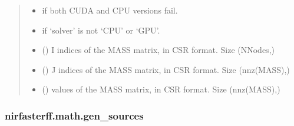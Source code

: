 \documentclass[letterpaper,10pt,english]{sphinxmanual}
\begin{document}
\begin{fulllineitems}
\begin{quote}
\begin{description}
\begin{itemize}
\end{itemize}

\begin{itemize}
\item {} 
\sphinxAtStartPar
{} \textendash{} if both CUDA and CPU versions fail.

\item {} 
\sphinxAtStartPar
{} \textendash{} if ‘solver’ is not ‘CPU’ or ‘GPU’.

\end{itemize}

\sphinxAtStartPar
\begin{itemize}
\item {} 
\sphinxAtStartPar
{} () \textendash{} I indices of the MASS matrix, in CSR format. Size (NNodes,)

\item {} 
\sphinxAtStartPar
{} () \textendash{} J indices of the MASS matrix, in CSR format. Size (nnz(MASS),)

\item {} 
\sphinxAtStartPar
{} () \textendash{} values of the MASS matrix, in CSR format. Size (nnz(MASS),)

\end{itemize}


\end{description}\end{quote}

\end{fulllineitems}


\sphinxstepscope


\subsubsection{nirfasterff.math.gen\_sources}
\label{\detokenize{_autosummary/nirfasterff.math.gen_sources:nirfasterff-math-gen-sources}}\label{\detokenize{_autosummary/nirfasterff.math.gen_sources::doc}}
\end{document}
